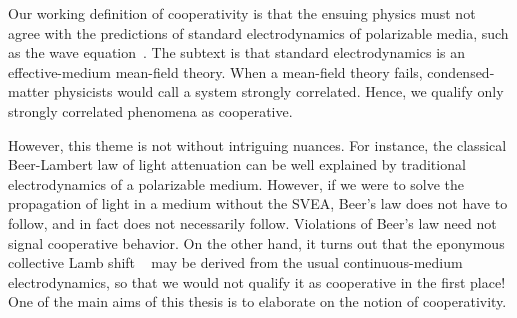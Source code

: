 Our working definition of cooperativity is that the ensuing physics must not agree with the predictions of standard electrodynamics of polarizable media, such as the wave equation~.  The subtext is that standard electrodynamics is an effective-medium mean-field theory. When a mean-field theory fails, condensed-matter physicists would call a system strongly correlated. Hence, we qualify only strongly correlated phenomena as cooperative.

However, this theme is not without intriguing nuances. For instance, the classical Beer-Lambert law of light attenuation can be well explained by traditional electrodynamics of a polarizable medium. However, if we were to solve the propagation of light in a medium without the SVEA, Beer's law does not have to follow, and in fact does not necessarily follow. Violations of Beer's law need not signal cooperative behavior. On the other hand, it turns out that the eponymous collective Lamb shift ~ may be derived from the usual continuous-medium electrodynamics, so that we would not qualify it as cooperative in the first place! One of the main aims of this thesis is to elaborate on the notion of cooperativity.
